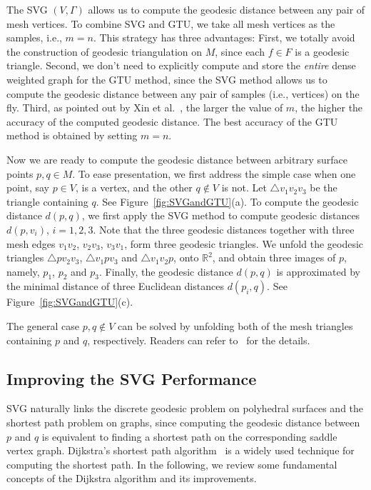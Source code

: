   The SVG $(V,\Gamma)$ allows us to compute the geodesic distance between any pair of mesh vertices.
  To combine SVG and GTU, we take all mesh vertices as the samples, i.e., $m=n$.
  This strategy has three advantages:
  First, we totally avoid the construction of geodesic triangulation on $M$, since each $f\in F$ is a geodesic triangle.
  Second, we don't need to explicitly compute and store the \textit{entire} dense weighted graph for the GTU method,
  since the SVG method allows us to compute the geodesic distance between any pair of samples (i.e., vertices) on the fly.
  Third, as pointed out by Xin et al.~\cite{xin2012constant}, the larger the value of $m$, the higher the accuracy of the computed geodesic distance.
  The best accuracy of the GTU method is obtained by setting $m=n$.

  Now we are ready to compute the geodesic distance between arbitrary surface points $p,q\in M$.
  To ease presentation, we first address the simple case when one point, say $p\in V$, is a vertex, and the other $q\notin V$ is not.
  Let $\bigtriangleup v_1v_2v_3$ be the triangle containing $q$. See Figure~\ref{fig:SVGandGTU}(a).
  To compute the geodesic distance $d(p,q)$, we first apply the SVG method to compute geodesic distances $d(p,v_i)$, $i=1,2,3$.
  Note that the three geodesic distances together with three mesh edges $v_1v_2$, $v_2v_3$, $v_3v_1$, form three geodesic triangles.
  We unfold the geodesic triangles $\bigtriangleup pv_2v_3$, $\bigtriangleup v_1pv_3$ and $\bigtriangleup v_1v_2p$, onto $\mathbb{R}^2$,
  and obtain three images of $p$, namely, $p_1$, $p_2$ and $p_3$.
  Finally, the geodesic distance $d(p,q)$ is approximated by the minimal distance of three Euclidean distances $d(p_i,q)$.
  See Figure~\ref{fig:SVGandGTU}(c).

  The general case $p, q\notin V$ can be solved by unfolding both of the mesh triangles containing $p$ and $q$, respectively.
  Readers can refer to~\cite{xin2012constant} for the details.

\subsection{Improving the SVG Performance}

  SVG naturally links the discrete geodesic problem on polyhedral surfaces and the shortest path problem on graphs,
  since computing the geodesic distance between $p$ and $q$ is equivalent to finding a shortest path on the corresponding saddle vertex graph.
  Dijkstra's shortest path algorithm~\cite{dijkstra1959note} is a widely used technique for computing the shortest path.
  In the following, we review some fundamental concepts of the Dijkstra algorithm and its improvements.


